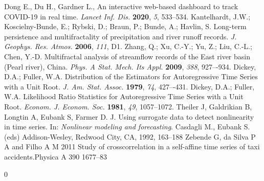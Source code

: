 \documentclass[onecolumn, preprint,aps,amsmath, amssymb, superscriptaddress]{revtex4}
\begin{document}
\begin{thebibliography}{99}
Dong E., Du H., Gardner L., An interactive web-based dashboard to track COVID-19 in real time. {\em Lancet Inf. Dis.} {\bf 2020}, {\em 5}, 533--534.
Kantelhardt, J.W.; Koscielny-Bunde, E.; Rybski, D.; Braun, P.; Bunde, A.; Havlin, S. Long-term persistence and multifractality of precipitation and river runoff records. {\em J. Geophys. Res. Atmos.} {\bf 2006}, {\em 111}, D1. 
Zhang, Q.; Xu, C.-Y.; Yu, Z.; Liu, C.-L.; Chen, Y.-D. Multifractal analysis of streamflow records of the East river basin (Pearl river), China. {\em Phys. A Stat. Mech. Its Appl.} {\bf 2009}, {\em 388}, 927–-934.
Dickey, D.A.; Fuller, W.A. Distribution of the Estimators for Autoregressive Time Series with a Unit Root. {\em J. Am. Stat. Assoc.} {\bf 1979}, {\em 74}, 427–-431.
Dickey, D.A.; Fuller, W.A. Likelihood Ratio Statistics for Autoregressive Time Series with a Unit Root. {\em Econom. J. Econom. Soc.} {\bf 1981}, {\em 49}, 1057–1072.
Theiler J, Galdrikian B, Longtin A, Eubank S, Farmer D. J. Using surrogate data to detect nonlinearity in time series. In: {\em Nonlinear modeling and forecasting}. Casdagli M., Eubank S.(eds) Addison-Wesley, Redwood City, CA, 1992, 163--188
Zebende G, da Silva P A and Filho A M 2011 Study of crosscorrelation
in a self-affine time series of taxi accidents.Physica A 390 1677–83
\end{thebibliography}0
\end{document}
